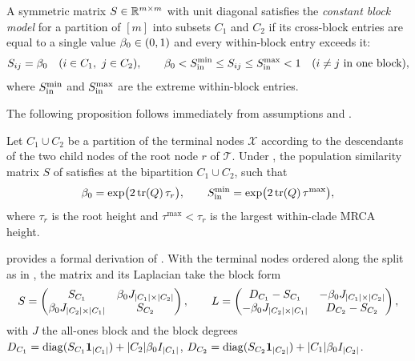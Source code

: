 \begin{definition}\label{def:cfbm}
A symmetric matrix $S \in \mathbb{R}^{m \times m}$ with unit diagonal satisfies the \emph{constant block model} for a partition of $[m]$ into subsets $C_1$ and $C_2$ if its cross-block entries are equal to a single value $\beta_0\in(0,1)$ and every within-block entry exceeds it:
\begin{equation}\label{eq:cfbm_floor}
   S_{ij}=\bze\quad(i\in C_1,\ j\in C_2),
   \qquad
   \bze<\Sin^{\min}\le S_{ij}\le\Sin^{\max}<1\quad(i\ne j\ \text{in one block}),
\end{equation}
where $S_{\mathrm{in}}^{\min}$ and $S_{\mathrm{in}}^{\max}$ are the extreme within-block entries. %
\end{definition}

The following proposition follows immediately from assumptions  and .
\begin{proposition}\label{prop:cfbm}
Let $C_1 \cup C_2$ be a partition of the terminal nodes $\mathcal X$ according to the descendants of the two child nodes of the root node $r$ of $\mathcal{T}$.
Under , the population similarity matrix $S$ of  satisfies
 at the bipartition $C_1 \cup C_2$, such that %
\begin{equation}\label{eq:cfbm_from_model}
   \beta_0 = \exp\bigl(2\,\mathrm{tr}(Q)\,\tau_r\bigr),
   \qquad
   S_{\mathrm{in}}^{\min} = \exp\bigl(2\,\mathrm{tr}(Q)\,\tau^{\max}\bigr),
\end{equation}
where $\tau_r$ is the root height and $\tau^{\max}<\tau_r$ is the largest within-clade MRCA height.
\end{proposition}

\noindent {} provides a formal derivation of . With the terminal nodes ordered along the split as in
, the matrix and its Laplacian take the block form
\begin{equation}\label{eq:block_forms}
   S=\begin{pmatrix} S_{C_1} & \beta_0 J_{|C_1|\times|C_2|}\\ \beta_0 J_{|C_2|\times|C_1|} & S_{C_2}\end{pmatrix},
   \qquad
   L=\begin{pmatrix} D_{C_1}-S_{C_1} & -\beta_0 J_{|C_1|\times|C_2|}\\ -\beta_0 J_{|C_2|\times|C_1|} & D_{C_2}-S_{C_2}\end{pmatrix},
\end{equation}
with $J$ the all-ones block and the block degrees
$D_{C_1}=\operatorname{diag}(S_{C_1}\mathbf{1}_{|C_1|})+|C_2|\beta_0 I_{|C_1|}$,
$D_{C_2}=\operatorname{diag}(S_{C_2}\mathbf{1}_{|C_2|})+|C_1|\beta_0 I_{|C_2|}$. 


